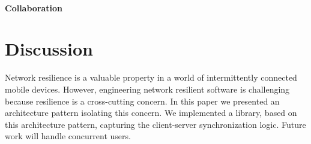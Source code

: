 \documentclass{llncs}
\begin{document}
\paragraph{Collaboration}

\section{Discussion}

Network resilience is a valuable property in a world of intermittently connected mobile devices. However, engineering network resilient software is challenging because resilience is a cross-cutting concern. In this paper we presented an architecture pattern isolating this concern. We implemented a library, based on this architecture pattern, capturing the client-server synchronization logic. Future work will handle concurrent users.



\end{document}
